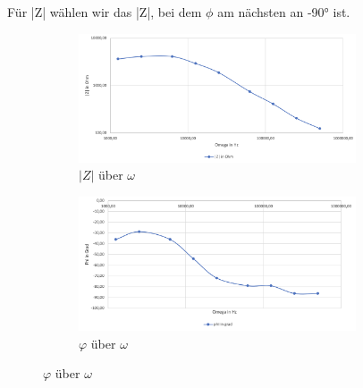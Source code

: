         Für |Z| wählen wir das |Z|, bei dem $\phi$ am nächsten an -90° ist.

        \begin{figure}[H]
            \begin{subfigure}{0.5\textwidth}
                \centering
                \includegraphics[width=0.9\textwidth]{bilder/Versuch3_1.png}
                \caption{$|Z|$ über $\omega$}
                \label{fig:Versuch3_Messwerte_1}
            \end{subfigure}
            \begin{subfigure}{0.5\textwidth}
                \centering
                \includegraphics[width=0.9\textwidth]{bilder/Versuch3_2.png}
                \caption{$\varphi$ über $\omega$}
                \label{fig:Versuch3_Messwerte_2}
            \end{subfigure}
        \end{figure}

